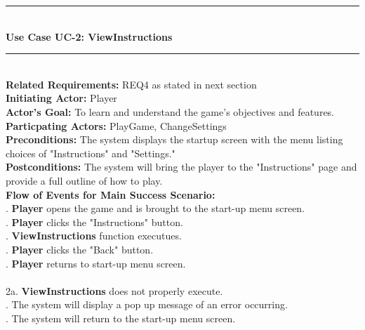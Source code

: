 \documentclass[12pt, titlepage]{article}
\begin{document}
\noindent \rule{400 pt}{1 pt}\\
{\bf Use Case UC-2: ViewInstructions}\\
\rule{400 pt}{1 pt}\\
{\bf Related Requirements:} REQ4 as stated in next section \\
{\bf Initiating Actor:} Player \\
{\bf Actor's Goal:} To learn and understand the game's objectives and features. \\
{\bf Particpating Actors:} PlayGame, ChangeSettings \\
{\bf Preconditions:} The system displays the startup screen with the menu listing choices of "Instructions" and "Settings." \\
{\bf Postconditions:} The system will bring the player to the "Instructions" page and provide a full outline of how to play. \\
{\bf Flow of Events for Main Success Scenario:} \\
. {\bf Player} opens the game and is brought to the start-up menu screen.\\
. {\bf Player} clicks the "Instructions" button. \\
. {\bf ViewInstructions} function executues. \\
. {\bf Player} clicks the "Back" button.\\
. {\bf Player} returns to start-up menu screen.\\
 \\
2a. {\bf ViewInstructions} does not properly execute.\\
. The system will display a pop up message of an error occurring. \\
. The system will return to the start-up menu screen.\\
\end{document}
